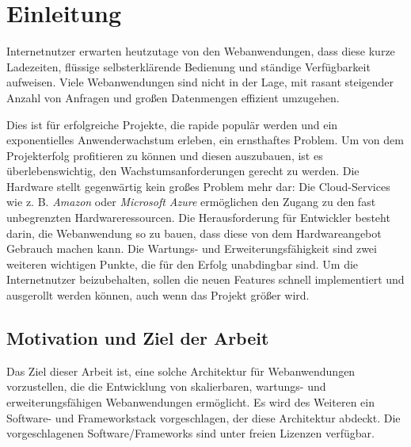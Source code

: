 \chapter{Einleitung}

Internetnutzer erwarten heutzutage von den Webanwendungen, dass diese kurze Ladezeiten, flüssige selbsterklärende Bedienung und ständige Verfügbarkeit aufweisen. Viele Webanwendungen sind nicht in der Lage, mit rasant steigender Anzahl von Anfragen und großen Datenmengen effizient umzugehen.

Dies ist für erfolgreiche Projekte, die rapide populär werden und ein exponentielles Anwenderwachstum erleben, ein ernsthaftes Problem. Um von dem Projekterfolg profitieren zu können und diesen auszubauen, ist es überlebenswichtig, den Wachstumsanforderungen gerecht zu werden. Die Hardware stellt gegenwärtig kein großes Problem mehr dar: Die Cloud-Services wie z. B. \textit{Amazon} oder \textit{Microsoft Azure} ermöglichen den Zugang zu den fast unbegrenzten Hardwareressourcen. Die Herausforderung für Entwickler besteht darin, die Webanwendung so zu bauen, dass diese von dem Hardwareangebot Gebrauch machen kann. Die Wartungs- und Erweiterungsfähigkeit sind zwei weiteren wichtigen Punkte, die für den Erfolg unabdingbar sind. Um die Internetnutzer beizubehalten, sollen die neuen Features schnell implementiert und ausgerollt werden können, auch wenn das Projekt größer wird.

\section{Motivation und Ziel der Arbeit}

Das Ziel dieser Arbeit ist, eine solche Architektur für Webanwendungen vorzustellen, die die Entwicklung von skalierbaren, wartungs- und erweiterungsfähigen Webanwendungen ermöglicht. Es wird des Weiteren ein Software-  und Frameworkstack vorgeschlagen, der diese Architektur abdeckt. Die vorgeschlagenen Software/Frameworks sind unter freien Lizenzen verfügbar.


